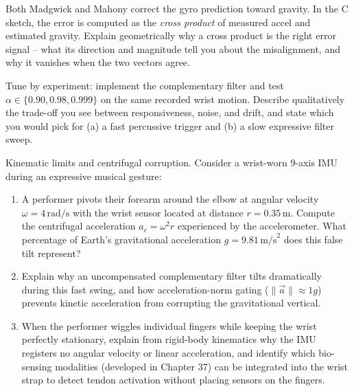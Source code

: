 \begin{exercise}
Both Madgwick and Mahony correct the gyro prediction toward gravity. In the C sketch, the
error is computed as the \emph{cross product} of measured accel and estimated gravity.
Explain geometrically why a cross product is the right error signal -- what its direction
and magnitude tell you about the misalignment, and why it vanishes when the two vectors
agree.
\end{exercise}

\begin{exercise}
Tune by experiment: implement the complementary filter and test $\alpha \in
\{0.90,\allowbreak 0.98,\allowbreak 0.999\}$ on the same recorded wrist motion. Describe qualitatively the
trade-off you see between responsiveness, noise, and drift, and state which you would
pick for (a) a fast percussive trigger and (b) a slow expressive filter sweep.
\end{exercise}

\begin{exercise}
Kinematic limits and centrifugal corruption. Consider a wrist-worn 9-axis IMU during an expressive musical gesture:
\begin{enumerate}[label=(\alph*)]
  \item A performer pivots their forearm around the elbow at angular velocity $\omega = 4\,\text{rad/s}$ with the wrist sensor located at distance $r = 0.35\,\text{m}$. Compute the centrifugal acceleration $a_c = \omega^2 r$ experienced by the accelerometer. What percentage of Earth's gravitational acceleration $g = 9.81\,\text{m/s}^2$ does this false tilt represent?
  \item Explain why an uncompensated complementary filter tilts dramatically during this fast swing, and how acceleration-norm gating ($\|\vec{a}\| \approx 1g$) prevents kinetic acceleration from corrupting the gravitational vertical.
  \item When the performer wiggles individual fingers while keeping the wrist perfectly stationary, explain from rigid-body kinematics why the IMU registers no angular velocity or linear acceleration, and identify which bio-sensing modalities (developed in Chapter 37) can be integrated into the wrist strap to detect tendon activation without placing sensors on the fingers.
\end{enumerate}
\end{exercise}
